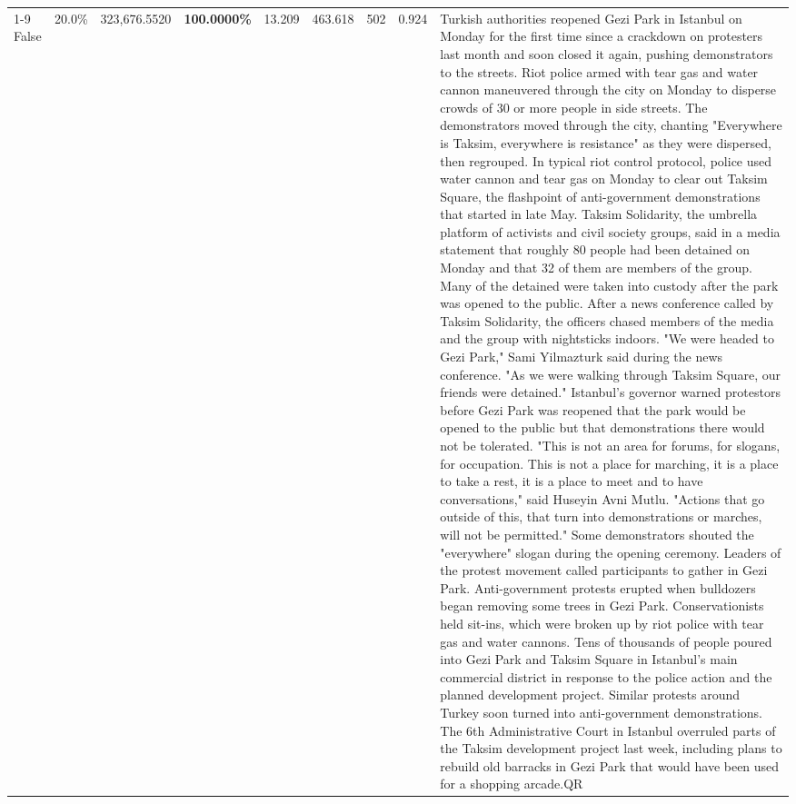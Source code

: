 \begin{table}[H]
\begin{tabular}{lllrlllll}
\cline{1-9}
False & 20.0\% & 323,676.5520 & \bfseries \color{red} 100.0000\% & 13.209 & 463.618 & 502 & 0.924 & Turkish authorities reopened Gezi Park in Istanbul on Monday for the first time since a crackdown on protesters last month and soon closed it again, pushing demonstrators to the streets. Riot police armed with tear gas and water cannon maneuvered through the city on Monday to disperse crowds of 30 or more people in side streets. The demonstrators moved through the city, chanting "Everywhere is Taksim, everywhere is resistance" as they were dispersed, then regrouped. In typical riot control protocol, police used water cannon and tear gas on Monday to clear out Taksim Square, the flashpoint of anti-government demonstrations that started in late May. Taksim Solidarity, the umbrella platform of activists and civil society groups, said in a media statement that roughly 80 people had been detained on Monday and that 32 of them are members of the group. Many of the detained were taken into custody after the park was opened to the public. After a news conference called by Taksim Solidarity, the officers chased members of the media and the group with nightsticks indoors. "We were headed to Gezi Park," Sami Yilmazturk said during the news conference. "As we were walking through Taksim Square, our friends were detained." Istanbul's governor warned protestors before Gezi Park was reopened that the park would be opened to the public but that demonstrations there would not be tolerated. "This is not an area for forums, for slogans, for occupation. This is not a place for marching, it is a place to take a rest, it is a place to meet and to have conversations," said Huseyin Avni Mutlu. "Actions that go outside of this, that turn into demonstrations or marches, will not be permitted." Some demonstrators shouted the "everywhere" slogan during the opening ceremony. Leaders of the protest movement called participants to gather in Gezi Park. Anti-government protests erupted when bulldozers began removing some trees in Gezi Park. Conservationists held sit-ins, which were broken up by riot police with tear gas and water cannons. Tens of thousands of people poured into Gezi Park and Taksim Square in Istanbul's main commercial district in response to the police action and the planned development project. Similar protests around Turkey soon turned into anti-government demonstrations. The 6th Administrative Court in Istanbul overruled parts of the Taksim development project last week, including plans to rebuild old barracks in Gezi Park that would have been used for a shopping arcade.QR \\

\end{tabular}
\end{table}
